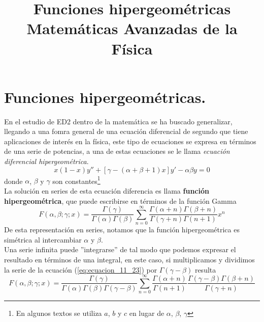 
\usepackage{mathrsfs}
\title{Funciones hipergeométricas \\ {\large Matemáticas Avanzadas de la Física}}
\date{ }

\renewcommand\labelenumii{\theenumi.{\arabic{enumii}}}
\maketitle
\fontsize{14}{14}\selectfont
\section{Funciones hipergeométricas.}
En el estudio de ED2 dentro de la matemática se ha buscado generalizar, llegando a una fomra general de una ecuación diferencial de segundo que tiene aplicaciones de interés en la física, este tipo de ecuaciones se expresa en términos de una serie de potencias, a una de estas ecuaciones se le llama \emph{ecuación diferencial hipergeométrica}.
\begin{equation}
 x(1-x) y'' + [ \gamma - (\alpha + \beta + 1) x ] y' - \alpha \beta y = 0
\label{eq:ecuacion_11_22}
\end{equation}
donde $\alpha$, $\beta$ y $\gamma$ son constantes\footnote{En algunos textos se utiliza $a$, $b$ y $c$ en lugar de $\alpha$, $\beta$, $\gamma$}
\\
La solución en series de esta ecuación diferencia es llama \textbf{función hipergeométrica}, que puede escribirse en términos de la función Gamma
\begin{equation}
F( \alpha, \beta; \gamma; x ) = \dfrac{\Gamma(\gamma)}{\Gamma(\alpha) \Gamma(\beta)} \sum_{n=0}^{\infty} \dfrac{\Gamma(\alpha + n) \Gamma(\beta + n)}{\Gamma(\gamma +n) \Gamma(n+1)} x^{n} 
\label{eq:ecuacion_11_23}
\end{equation}
De esta representación en series, notamos que la función hipergeométrica es simétrica al intercambiar $\alpha$ y $\beta$. 
\\
Una serie infinita puede ''integrarse'' de tal modo que podemos expresar el resultado en términos de una integral, en este caso, si multiplicamos y dividimos la serie de la ecuación (\ref{eq:ecuacion_11_23}) por $\Gamma(\gamma - \beta)$ resulta
\[ F( \alpha, \beta; \gamma; x ) = \dfrac{\Gamma(\gamma)}{\Gamma(\alpha) \Gamma(\beta) \Gamma(\gamma - \beta)}  \sum_{n=0}^{\infty} \dfrac{\Gamma(\alpha + n)}{ \Gamma(n+1)} \dfrac{\Gamma(\gamma - \beta) \Gamma(\beta + n)}{\Gamma(\gamma + n)} \]
